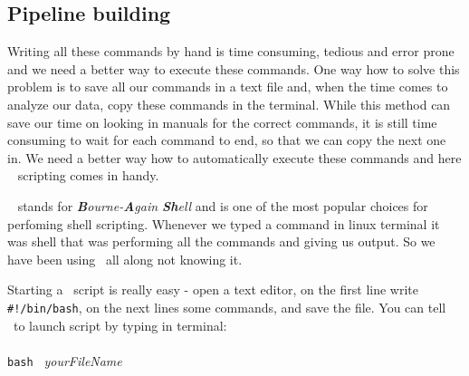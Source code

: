 \subsection{Pipeline building}
Writing all these commands by hand is time consuming, tedious and error prone
and we need a better way to execute these commands.
One way how to solve this problem is to save all our commands
in a text file and, when the time comes to analyze our data, copy these
commands in the terminal. While this method can save our time on looking
in manuals for the correct commands, it is still time consuming to wait
for each command to end, so that we can copy the next one in. 
We need a better way how to automatically execute these commands and
here \bash~ scripting comes in handy.

\bash~ stands for \textit{\textbf{B}ourne-\textbf{A}gain \textbf{Sh}ell}
and is one of the most popular choices for perfoming shell scripting. 
Whenever we typed a command in linux terminal it was shell that was
performing all the commands and giving us output.
So we have been using \bash~all along not knowing it.

Starting a \bash~script is really easy - open a text editor, on the
first line write \texttt{\#!/bin/bash}, on the next lines some commands,
and save the file. You can tell \bash~to launch script by typing in terminal:\\~\\
\texttt{bash }\textit{ yourFileName}\\

